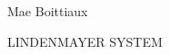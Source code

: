 \documentclass[11pt]{report}
\author{Hollie-Mae Boittiaux}
\begin{document}
\begin{titlepage}
    {\large Mae Boittiaux \par}
    {\huge LINDENMAYER SYSTEM \par}
\end{titlepage}

\tableofcontents

\cite{example-cite}

\clearpage
\printbibliography
\end{document}
